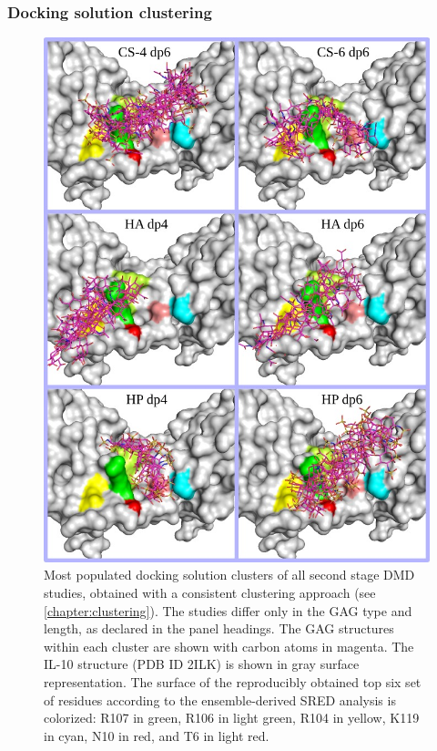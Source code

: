\subsubsection{Docking solution clustering}


\begin{figure}
\centering
\includegraphics[width=1.0\textwidth]{gfx/dmdil10/2ndstage_allclusters_04.jpg}
\caption[]{
Most populated docking solution clusters of all second stage DMD studies,
obtained with a consistent clustering approach (see \cref{chapter:clustering}).
The studies differ only in the GAG type and length, as declared in the panel
headings. The GAG structures within each cluster are shown with carbon atoms in
magenta. The IL-10 structure (PDB ID 2ILK) is shown in gray surface
representation. The surface of the reproducibly obtained top six set of residues
according to the ensemble-derived SRED analysis is colorized: R107 in green,
R106 in light green, R104 in yellow, K119 in cyan, N10 in red, and T6 in light
red.}
\label{fig:dmdil10:2nd_stage_all_clusters}
\end{figure}



